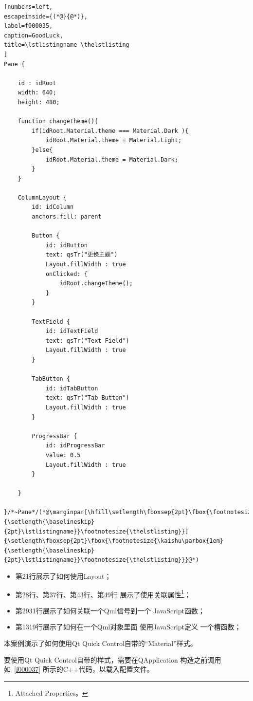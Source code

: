 {\begin{lstlisting}[numbers=left,
escapeinside={(*@}{@*)},
label=f000035,
caption=GoodLuck,
title=\lstlistingname \thelstlisting
]
Pane {

    id : idRoot
    width: 640;
    height: 480;

    function changeTheme(){
        if(idRoot.Material.theme === Material.Dark ){
            idRoot.Material.theme = Material.Light;
        }else{
            idRoot.Material.theme = Material.Dark;
        }
    }

    ColumnLayout {
        id: idColumn
        anchors.fill: parent

        Button {
            id: idButton
            text: qsTr("更换主题")
            Layout.fillWidth : true
            onClicked: {
                idRoot.changeTheme();
            }
        }

        TextField {
            id: idTextField
            text: qsTr("Text Field")
            Layout.fillWidth : true
        }

        TabButton {
            id: idTabButton
            text: qsTr("Tab Button")
            Layout.fillWidth : true
        }

        ProgressBar {
            id: idProgressBar
            value: 0.5
            Layout.fillWidth : true
        }

    }

}/*~Pane*/(*@\marginpar[\hfill\setlength\fboxsep{2pt}\fbox{\footnotesize{\kaishu\parbox{1em}{\setlength{\baselineskip}{2pt}\lstlistingname}}\footnotesize{\thelstlisting}}]{\setlength\fboxsep{2pt}\fbox{\footnotesize{\kaishu\parbox{1em}{\setlength{\baselineskip}{2pt}\lstlistingname}}\footnotesize{\thelstlisting}}}@*)\end{lstlisting}          %
}\fi%

\begin{itemize}
\item 第21行展示了如何使用Layout；
\item 第28行、第37行、第43行、第49行
展示了使用关联属性\footnote{
Attached Properties。
}；
\item 第29\raisebox{0.16ex}{\sourcefonttwo\~{}}31行展示了如何关联一个Qml信号到一个
JavaScript函数；%
\item 第13\raisebox{0.16ex}{\sourcefonttwo\~{}}19行展示了如何在一个Qml对象里面
使用JavaScript定义
一个槽函数；
\end{itemize}

本案例演示了如何使用Qt Quick Control自带的“Material”样式。

要使用Qt Quick Control自带的样式，需要在QApplication
构造之前调用如\lstlistingname\ \ref{f000037}
所示的C{\sourcefonttwo{}+}{\sourcefonttwo{}+}代码，以载入配置文件。

